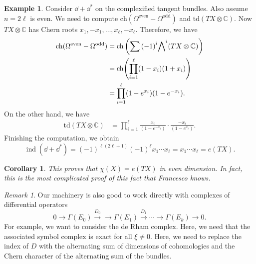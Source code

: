 \documentclass[leqno, openany]{memoir}
\newtheorem{cor}[thm]{Corollary}
\theoremstyle{definition}
\newtheorem{exm}[thm]{Example}
\theoremstyle{remark}
\newtheorem{rmk}[thm]{Remark}
\theoremstyle{plain}
\theoremstyle{definition}
\theoremstyle{remark}
\newcommand{\C}{\mathbb{C}}
\newcommand{\mr}[1]{\mathrm{#1}}
\DeclareMathOperator{\ch}{ch}
\DeclareMathOperator{\ind}{ind}
\begin{document}
\begin{exm}
    Consider $\dd + \dd^*$ on the complexified tangent bundles. Also assume $n = 2 \ell$ is even. We need to compute $\mr{ch}(\Omega^{\mr{even}} - \Omega^{\mr{odd}})$ and $\mr{td}(TX \otimes \C)$. Now $TX \otimes \C$ has Chern roots $x_1, -x_1, \ldots, x_{\ell}, -x_{\ell}$. Therefore, we have
    \begin{align*}
        \mr{ch}(\Omega^{\mr{even}} - \Omega^{\mr{odd}}) &= \ch\qty(\sum {(-1)}^i {\bigwedge}^i (TX \otimes \C)) \\
                                                        &= \mr{ch}\qty(\prod_{i=1}^{\ell} (1-x_i) (1+x_i)) \\
                                                        &= \prod_{i=1}^{\ell} (1-e^{x_i})(1-e^{-x_i}).
    \end{align*}
    On the other hand, we have
    \begin{align*}
        \mr{td}(TX \otimes \C) &= \prod_{i=1}^{\ell} \frac{x_i}{(1-e^{-x_i})} \cdot \frac{-x_i}{(1-e^{x_i})}.
    \end{align*}
    Finishing the computation, we obtain
    \[ \ind(\dd + \dd^*) = {(-1)}^{\ell(2\ell+1)} {(-1)}^{\ell} x_1 \cdots x_{\ell} = x_1 \cdots x_{\ell} = e(TX). \]
\end{exm}

\begin{cor}
    This proves that $\chi(X) = e(TX)$ in even dimension. In fact, this is the most complicated proof of this fact that Francesco knows.
\end{cor}

\begin{rmk}
    Our machinery is also good to work directly with complexes of differential operators
    \[ 0 \to \Gamma(E_0) \xrightarrow{D_0} \to \Gamma(E_1) \xrightarrow{D_1} \cdots \to \Gamma(E_k) \to 0. \]
    For example, we want to consider the de Rham complex. Here, we need that the associated symbol complex is exact for all $\xi \neq 0$. Here, we need to replace the index of $D$ with the alternating sum of dimensions of cohomologies and the Chern character of the alternating sum of the bundles.
\end{rmk}
\end{document}
